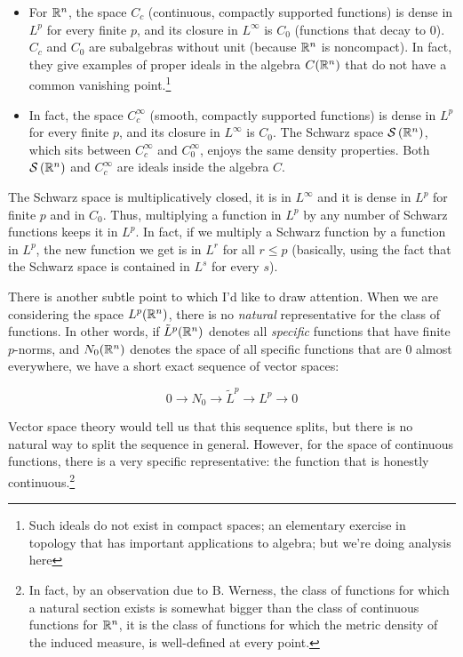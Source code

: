 \documentclass[a4paper]{amsart}
\newcommand{\schwarz}[1]{\mathcal{S}\left(#1\right)}
\begin{document}
\begin{itemize}
\item For $\mathbb{R}^n$, the space $C_c$ (continuous, compactly supported
  functions) is dense in $L^p$ for every finite $p$, and its closure
  in $L^\infty$ is $C_0$ (functions that decay to $0$). $C_c$ and $C_0$
  are subalgebras without unit (because $\mathbb{R}^n$ is noncompact). In
  fact, they give examples of proper ideals in the algebra $C(\mathbb{R}^n)$
  that do not have a common vanishing point.\footnote{Such ideals do
    not exist in compact spaces; an elementary exercise in topology
    that has important applications to algebra; but we're doing
    analysis here}

\item In fact, the space $C_c^\infty$ (smooth, compactly supported
  functions) is dense in $L^p$ for every finite $p$, and its closure
  in $L^\infty$ is $C_0$. The Schwarz space $\schwarz{\R^n}$, which sits between
  $C_c^\infty$ and $C_0^\infty$, enjoys the same density properties. 
  Both $\schwarz{\R^n}$ and $C_c^\infty$ are ideals inside the algebra $C$.

\end{itemize}

The Schwarz space is multiplicatively closed, it is in $L^\infty$ and
it is dense in $L^p$ for finite $p$ and in $C_0$. Thus, multiplying a
function in $L^p$ by any number of Schwarz functions keeps it in
$L^p$.  In fact, if we multiply a Schwarz function by a function in
$L^p$, the new function we get is in $L^r$ for all $r \le p$
(basically, using the fact that the Schwarz space is contained in
$L^s$ for every $s$).

There is another subtle point to which I'd like to draw
attention. When we are considering the space $L^p(\mathbb{R}^n)$, there is no
{\em natural} representative for the class of functions. In other
words, if $\tilde{L}^p(\mathbb{R}^n)$ denotes all {\em specific} functions that have finite $p$-norms,
and $N_0(\mathbb{R}^n)$ denotes the space of all specific functions that are $0$ almost everywhere,
we have a short exact sequence of vector spaces:

$$0 \to N_0 \to \tilde{L}^p \to L^p \to 0$$

Vector space theory would tell us that this sequence splits, but there
is no natural way to split the sequence in general.  However, for the
space of continuous functions, there is a very specific
representative: the function that is honestly continuous.\footnote{In
  fact, by an observation due to B. Werness, the class of functions
  for which a natural section exists is somewhat bigger than the class
  of continuous functions for $\mathbb{R}^n$, it is the class of functions for
  which the metric density of the induced measure, is well-defined at
  every point.}
\end{document}
